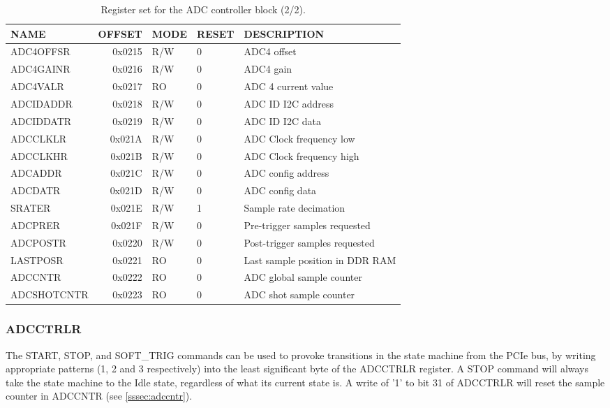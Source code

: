 \documentclass{article}
\begin{document}
\begin{table}[htbp]
  \centering
  \begin{tabularx}{\textwidth}{|l|r|l|l|X|}
    \hline
    \textbf{NAME} & \textbf{OFFSET} & \textbf{MODE} & \textbf{RESET} & \textbf{DESCRIPTION} \\
    \hline
    \hline
    ADC4OFFSR & 0x0215 & R/W & 0 & ADC4 offset \\
    \hline
    ADC4GAINR & 0x0216 & R/W & 0 & ADC4 gain \\
    \hline
    ADC4VALR & 0x0217 & RO & 0 & ADC 4 current value \\
    \hline
    ADCIDADDR & 0x0218 & R/W & 0 & ADC ID I2C address \\
    \hline
    ADCIDDATR & 0x0219 & R/W & 0 & ADC ID I2C data \\
    \hline
    ADCCLKLR & 0x021A & R/W & 0 & ADC Clock frequency low \\
    \hline
    ADCCLKHR & 0x021B & R/W & 0 & ADC Clock frequency high \\
    \hline
    ADCADDR & 0x021C & R/W & 0 & ADC config address \\
    \hline
    ADCDATR & 0x021D & R/W & 0 & ADC config data \\
    \hline
    SRATER & 0x021E & R/W & 1 & Sample rate decimation \\
    \hline
    ADCPRER & 0x021F & R/W & 0 & Pre-trigger samples requested \\
    \hline
    ADCPOSTR & 0x0220 & R/W & 0 & Post-trigger samples requested \\
    \hline
    LASTPOSR & 0x0221 & RO & 0 & Last sample position in DDR RAM\\
    \hline
    ADCCNTR & 0x0222 & RO & 0 & ADC global sample counter \\
    \hline
    ADCSHOTCNTR & 0x0223 & RO & 0 & ADC shot sample counter \\
    \hline
  \end{tabularx}
  \caption{Register set for the ADC controller block (2/2).}
  \label{tab:adc_control2}
\end{table}

\subsubsection{ADCCTRLR}
The START, STOP, and SOFT\_TRIG commands can be used to provoke transitions in the state machine from the PCIe bus, by writing appropriate patterns (1, 2 and 3 respectively) into the least significant byte of the ADCCTRLR register. A STOP command will always take the state machine to the Idle state, regardless of what its current state is. A write of '1' to bit 31 of ADCCTRLR will reset the sample counter in ADCCNTR (see \ref{sssec:adccntr}).
\end{document}
